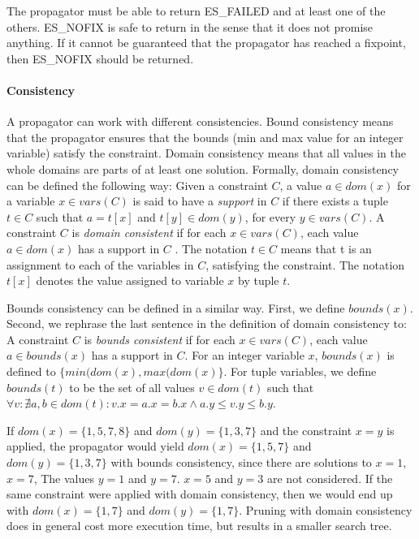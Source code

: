 \documentclass[a4paper,11pt]{article}
\begin{document}
The propagator must be able to return ES\_FAILED and at least one of the others. ES\_NOFIX is safe to return in the sense that it does not promise anything. If it cannot be guaranteed that the propagator has reached a fixpoint, then ES\_NOFIX should be returned. 

\paragraph{Consistency}
A propagator can work with different consistencies. Bound consistency means that the propagator ensures that the bounds (min and max value for an integer variable) satisfy the constraint. Domain consistency means that all values in the whole domains are parts of at least one solution. Formally, domain consistency can be defined the following way: Given a constraint $C$, a value $a\in dom(x)$ for a variable $x\in vars(C)$ is said to have a \textit{support} in $C$ if there exists a tuple $t\in C$ such that $a=t[x]$ and $t[y]\in dom(y)$, for every $y\in vars(C)$. A constraint $C$ is \textit{domain consistent} if for each $x\in vars(C)$, each value $a\in dom(x)$ has a support in $C$ \cite{FruehwirthMS06}. The notation $t\in C$ means that t is an assignment to each of the variables in $C$, satisfying the constraint. The notation $t[x]$ denotes the value assigned to variable $x$ by tuple $t$. 

Bounds consistency can be defined in a similar way. First, we define $bounds(x)$. Second, we rephrase the last sentence in the definition of domain consistency to: A constraint $C$ is \textit{bounds consistent} if for each $x\in vars(C)$, each value $a\in bounds(x)$ has a support in $C$. For an integer variable $x$, $bounds(x)$ is defined to $\{min(dom(x),max(dom(x)\}$. For tuple variables, we define $bounds(t)$ to be the set of all values $v\in dom(t)$ such that $\forall v:\nexists a,b\in dom(t):v.x=a.x=b.x \land a.y \le v.y \le b.y$.

If $dom(x)=\{1,5,7,8\}$ and $dom(y)=\{1,3,7\}$ and the constraint $x=y$ is applied, the propagator would yield $dom(x)=\{1,5,7\}$ and $dom(y)=\{1,3,7\}$ with bounds consistency, since there are solutions to $x=1$, $x=7$, The values $y=1$ and $y=7$. $x=5$ and $y=3$ are not considered. If the same constraint were applied with domain consistency, then we would end up with $dom(x)=\{1,7\}$ and $dom(y)=\{1,7\}$. Pruning with domain consistency does in general cost more execution time, but results in a smaller search tree.
\end{document}
